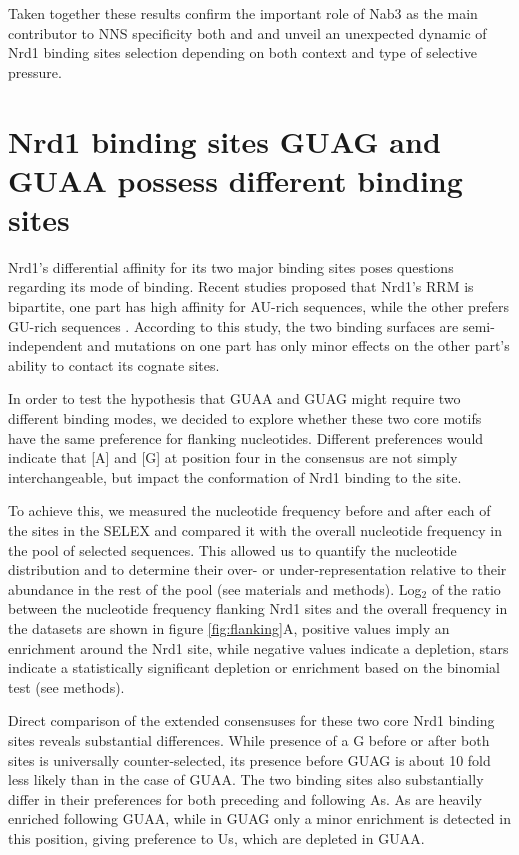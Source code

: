 Taken together these results confirm the important role of Nab3 as the main contributor to NNS specificity both \invivo{} and \invitro{} and unveil an unexpected dynamic of Nrd1 binding sites selection depending on both context and type of selective pressure.

\singlespacing
\section{Nrd1 binding sites GUAG and GUAA possess different binding sites}
\doublespacing

Nrd1’s differential affinity for its two major binding sites poses questions regarding its mode of binding. Recent studies proposed that Nrd1’s RRM is bipartite, one part has high affinity for AU-rich sequences, while the other prefers GU-rich sequences \cite{bacikova:2014:structure}. According to this study, the two binding surfaces are semi-independent and mutations on one part has only minor effects on the other part’s ability to contact its cognate sites. 

In order to test the hypothesis that GUAA and GUAG might require two different binding modes, we decided to explore whether these two core motifs have the same preference for flanking nucleotides. Different preferences would indicate that [A] and [G] at position four in the consensus are not simply interchangeable, but impact the conformation of Nrd1 binding to the site.

To achieve this, we measured the nucleotide frequency before and after each of the sites in the SELEX and compared it with the overall nucleotide frequency in the pool of selected sequences. 
This allowed us to quantify the nucleotide distribution and to determine their over- or under-representation relative to their abundance in the rest of the pool (see materials and methods).
Log$_2$ of the ratio between the nucleotide frequency flanking Nrd1 sites and the overall frequency in the datasets are shown in figure \ref{fig:flanking}A, positive values imply an enrichment around the Nrd1 site, while negative values indicate a depletion, stars indicate a statistically significant depletion or enrichment based on the binomial test (see methods).

Direct comparison of the extended consensuses for these two core Nrd1 binding sites reveals substantial differences. While presence of a G before or after both sites is universally counter-selected, its presence before GUAG is about 10 fold less likely than in the case of GUAA. The two binding sites also substantially differ in their preferences for both preceding and following As. As are heavily enriched following GUAA, while in GUAG only a minor enrichment is detected in this position, giving preference to Us, which are depleted in GUAA. 

